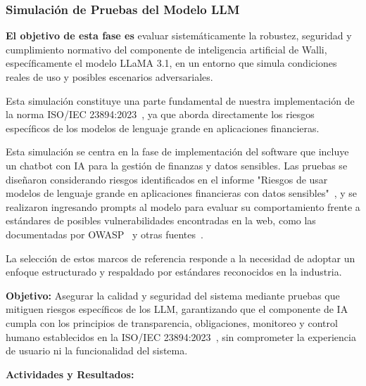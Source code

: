 \documentclass[12pt]{article}
\begin{document}
\subsubsection{Simulación de Pruebas del Modelo LLM}

\textbf{El objetivo de esta fase es} evaluar sistemáticamente la robustez, seguridad y cumplimiento 
normativo del componente de inteligencia artificial de Walli, específicamente el modelo LLaMA 3.1, 
en un entorno que simula condiciones reales de uso y posibles escenarios adversariales. 

Esta simulación constituye una parte fundamental de nuestra implementación de la norma 
ISO/IEC 23894:2023~\cite{iso23894}, ya que aborda directamente los riesgos específicos 
de los modelos de lenguaje grande en aplicaciones financieras.

Esta simulación se centra en la fase de implementación del software que incluye un chatbot 
con IA para la gestión de finanzas y datos sensibles. Las pruebas se diseñaron considerando 
riesgos identificados en el informe "Riesgos de usar modelos de lenguaje grande en aplicaciones 
financieras con datos sensibles"~\cite{lumenova}, y se realizaron ingresando prompts al modelo 
para evaluar su comportamiento frente a estándares de posibles vulnerabilidades encontradas en la web, 
como las documentadas por OWASP~\cite{fortanix} y otras fuentes~\cite{vstorm,wiz,cobalt,gtlaw,globalrelay}. 

La selección de estos marcos de referencia responde a la necesidad de adoptar un enfoque estructurado 
y respaldado por estándares reconocidos en la industria.

\textbf{Objetivo:} Asegurar la calidad y seguridad del sistema mediante pruebas que mitiguen 
riesgos específicos de los LLM, garantizando que el componente de IA cumpla con los principios 
de transparencia, obligaciones, monitoreo y control humano establecidos en la 
ISO/IEC 23894:2023~\cite{iso23894}, sin comprometer la experiencia de usuario ni la funcionalidad del sistema.

\textbf{Actividades y Resultados:}
\end{document}

